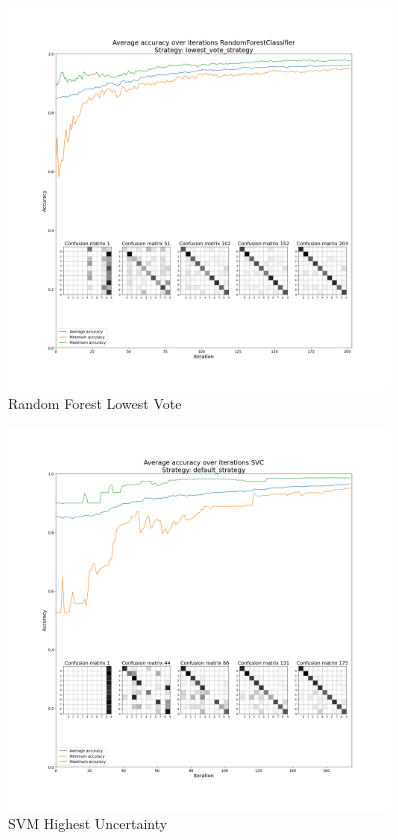 \begin{figure}[htbp]
\centering
\includegraphics[width=0.9\textwidth]{resources/images/active_learning_RandomForestClassifier_lowest_vote_strategy_average.png}
\caption{Random Forest Lowest Vote}
\end{figure}

\begin{figure}[htbp]
\centering
\includegraphics[width=0.9\textwidth]{resources/images/active_learning_SVC_default_strategy_average.png}
\caption{SVM Highest Uncertainty}
\end{figure}

